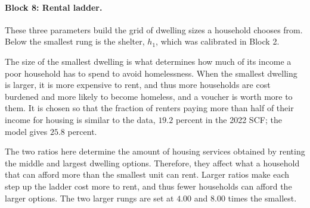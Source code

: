 \documentclass[10pt]{article}
\begin{document}
\paragraph{Block 8: Rental ladder.} These three parameters build the grid of dwelling
sizes a household chooses from. Below the smallest rung is the shelter, $h_1$, which was calibrated in Block 2.
\begin{description}\setlength{\itemsep}{0.25em}\setlength{\parskip}{0em}
\item[$h_2$, the smallest rental size.]   The size of the smallest dwelling is what determines how much of its income a poor household has to spend to avoid homelessness. When the smallest dwelling is larger, it is more expensive to rent, and thus more households are cost burdened and more likely to become homeless, and a voucher is worth more to them. It is chosen so that
the fraction of renters paying more than half of their income for housing is similar to
the data, $19.2$ percent in the 2022 SCF; the model gives $25.8$
percent.
\item[$h_3/h_2$ and $h_4/h_2$, the spacing of the ladder.]   The two ratios here determine the amount of housing services obtained by renting the middle and largest dwelling options. Therefore, they affect what a household that can afford more than the smallest unit can rent. Larger ratios make each step up the ladder cost more to rent, and thus fewer households can afford the larger options. The two larger
rungs are set at $4.00$ and $8.00$ times the smallest.
\end{description}
\end{document}

